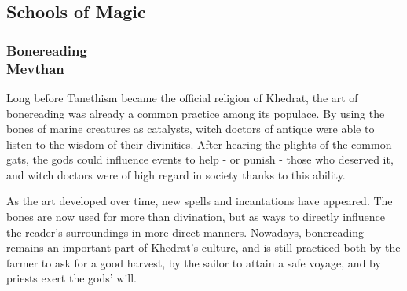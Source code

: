 \subsection*{Schools of Magic} \label{ssec::schoolsofmagic}




\subsubsection{Bonereading\\ \small{Mevthan}}
Long before Tanethism became the official religion of Khedrat, the art of bonereading was already a common practice among its populace.
By using the bones of marine creatures as catalysts, witch doctors of antique were able to listen to the wisdom of their divinities.
After hearing the plights of the common gats, the gods could influence events to help - or punish - those who deserved it, and witch doctors were of high regard in society thanks to this ability.

As the art developed over time, new spells and incantations have appeared.
The bones are now used for more than divination, but as ways to directly influence the reader's surroundings in more direct manners.
Nowadays, bonereading remains an important part of Khedrat's culture, and is still practiced both by the farmer to ask for a good harvest, by the sailor to attain a safe voyage, and by priests exert the gods' will.

